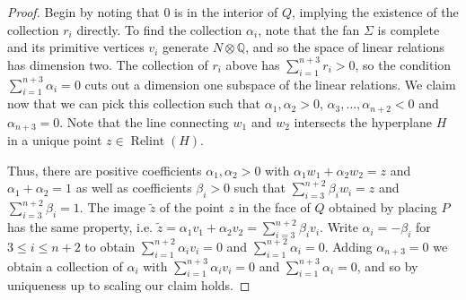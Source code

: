 \documentclass[10pt,a4paper]{amsart}
\newcommand{\Q}{\mathbb{Q}}
\begin{document}
\begin{proof}
Begin by noting that $0$ is in the interior of $Q$, implying the existence of the collection $r_i$ directly. 
To find the collection $\alpha_i$, note that the fan $\Sigma$ is complete and its primitive vertices $v_i$ generate $N\otimes \Q$, and so the space of linear relations has dimension two. The collection of $r_i$ above has $\sum_{i=1}^{n+3}r_i>0$, so the condition $\sum_{i=1}^{n+3}\alpha_i=0$ cuts out a dimension one subspace of the linear relations. We claim now that we can pick this collection such that $\alpha_1,\alpha_2>0$, $\alpha_3,\dots,\alpha_{n+2}<0$ and $\alpha_{n+3}=0$. Note that the line connecting $w_1$ and $w_2$ intersects the hyperplane $H$ in a unique point $z\in \operatorname{Relint}(H)$.

Thus, there are positive coefficients $\alpha_1, \alpha_2>0$ with $\alpha_1w_1+\alpha_2 w_2=z$ and $\alpha_1+\alpha_2=1$ as well as coefficients $\beta_i>0$ such that $\sum_{i=3}^{n+2}\beta_i w_i=z$ and $\sum_{i=3}^{n+2}\beta_i=1$. The image $\tilde{z}$ of the point $z$ in the face of $Q$ obtained by placing $P$ has the same property, i.e. $\tilde{z}=\alpha_1 v_1+\alpha_2 v_2=\sum_{i=3}^{n+2}\beta_i v_i$. Write $\alpha_i=-\beta_i$ for $3\le i\le n+2$ to obtain $\sum_{i=1}^{n+2}\alpha_i v_i=0$ and $\sum_{i=1}^{n+2}\alpha_i=0$. Adding $\alpha_{n+3}=0$ we obtain a collection of $\alpha_i$ with $\sum_{i=1}^{n+3}\alpha_i v_i=0$ and $\sum_{i=1}^{n+3}\alpha_i=0$, and so by uniqueness up to scaling our claim holds.
\end{proof}
\end{document}
